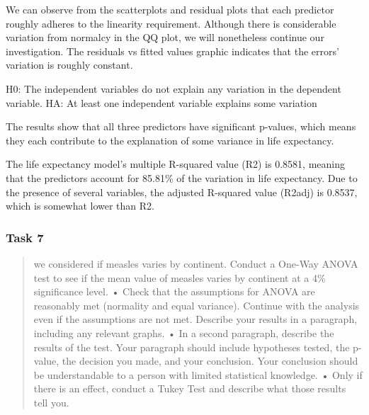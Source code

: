 \documentclass[
]{article}
\newenvironment{Shaded}{\begin{snugshade}}{\end{snugshade}}
\newcommand{\AttributeTok}[1]{\textcolor[rgb]{0.77,0.63,0.00}{#1}}
\newcommand{\FunctionTok}[1]{\textcolor[rgb]{0.00,0.00,0.00}{#1}}
\newcommand{\NormalTok}[1]{#1}
\newcommand{\SpecialCharTok}[1]{\textcolor[rgb]{0.00,0.00,0.00}{#1}}
\newcommand{\StringTok}[1]{\textcolor[rgb]{0.31,0.60,0.02}{#1}}
\begin{document}
We can observe from the scatterplots and residual plots that each
predictor roughly adheres to the linearity requirement. Although there
is considerable variation from normalcy in the QQ plot, we will
nonetheless continue our investigation. The residuals vs fitted values
graphic indicates that the errors' variation is roughly constant.

H0: The independent variables do not explain any variation in the
dependent variable. HA: At least one independent variable explains some
variation

The results show that all three predictors have significant p-values,
which means they each contribute to the explanation of some variance in
life expectancy.

The life expectancy model's multiple R-squared value (R2) is 0.8581,
meaning that the predictors account for 85.81\% of the variation in life
expectancy. Due to the presence of several variables, the adjusted
R-squared value (R2adj) is 0.8537, which is somewhat lower than R2.

\hypertarget{task-7}{%
\subsubsection{Task 7}\label{task-7}}

\begin{quote}
we considered if measles varies by continent. Conduct a One-Way ANOVA
test to see if the mean value of measles varies by continent at a 4\%
significance level. • Check that the assumptions for ANOVA are
reasonably met (normality and equal variance). Continue with the
analysis even if the assumptions are not met. Describe your results in a
paragraph, including any relevant graphs. • In a second paragraph,
describe the results of the test. Your paragraph should include
hypotheses tested, the p-value, the decision you made, and your
conclusion. Your conclusion should be understandable to a person with
limited statistical knowledge. • Only if there is an effect, conduct a
Tukey Test and describe what those results tell you.
\end{quote}

\begin{Shaded}
\end{Shaded}
\end{document}
